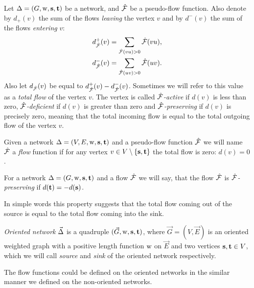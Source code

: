 \documentclass[12pt]{amsart}
\begin{document}
    \begin{definition}
      Let $\Delta = (G, \mathrm{w}, \mathbf{s}, \mathbf{t})$ be a network, and $\mathcal{\hat{F}}$ be a pseudo-flow function.
      Also denote by $d_{+}(v)$ the sum of the flows \emph{leaving} the vertex $v$ and by
      $d^{-}(v)$ the sum of the flows \emph{entering} $v$:
      \begin{align*}
        &d^{+}_{\mathcal{\hat{F}}}(v) = \sum_{\mathcal{\hat{F}}(vu) > 0} \mathcal{\hat{F}}(vu),\\
        &d^{-}_{\mathcal{\hat{F}}}(v) = \sum_{\mathcal{\hat{F}}(uv) > 0} \mathcal{\hat{F}}(uv).
      \end{align*}
      Also let $d_{\mathcal{\hat{F}}}(v)$ be equal to $d^{+}_{\mathcal{\hat{F}}}(v) - d^{-}_{\mathcal{\hat{F}}}(v)$.
      Sometimes we will refer to this value as a \emph{total flow} of the vertex $v$.
      The vertex is called \emph{$\mathcal{\hat{F}}$-active} if $d(v)$ is less than zero,
      \emph{$\mathcal{\hat{F}}$-deficient} if $d(v)$ is greater than zero and
      \emph{$\mathcal{\hat{F}}$-preserving} if $d(v)$ is precisely zero, meaning that the total incoming flow
      is equal to the total outgoing flow of the vertex $v$.
    \end{definition}
    \begin{definition}
      Given a network $\Delta = (V, E, \mathrm{w}, \mathbf{s}, \mathbf{t})$ and a pseudo-flow function $\mathcal{\hat{F}}$ we will name $\mathcal{\hat{F}}$ a
        \emph{flow} function if for any vertex $v \in V \setminus \{\mathbf{s}, \mathbf{t}\}$ the total flow is zero: $d(v) = 0$.
    \end{definition}
    \begin{definition}
      For a network $\Delta = (G, \mathrm{w}, \mathbf{s}, \mathbf{t})$ and a flow $\mathcal{\hat{F}}$ we will say,
      that the flow $\mathcal{\hat{F}}$ is \emph{$\mathcal{\hat{F}}$-preserving} if $d(\mathbf{t}) = -d(\mathbf{s})$.
    \end{definition}
    \begin{note}
      In simple words this property suggests
        that the total flow coming out of the source is equal to the total flow
        coming into the sink.
    \end{note}
    \begin{definition}
      \emph{Oriented network} $\vec{\Delta}$ is a quadruple $(\vec{G}, \mathrm{w}, \mathbf{s}, \mathbf{t})$, where
        $\vec{G} = (V, \vec{E})$ is an oriented weighted graph with
        a positive length function $\mathrm{w}$ on $\vec{E}$ and two vertices $\mathbf{s}, \mathbf{t} \in V$, which
        we will call \emph{source} and \emph{sink} of the oriented network respectively.
    \end{definition}
    \begin{note}
      The flow functions could be defined on the oriented networks in the similar manner
      we defined on the non-oriented networks.
    \end{note}
\end{document}
